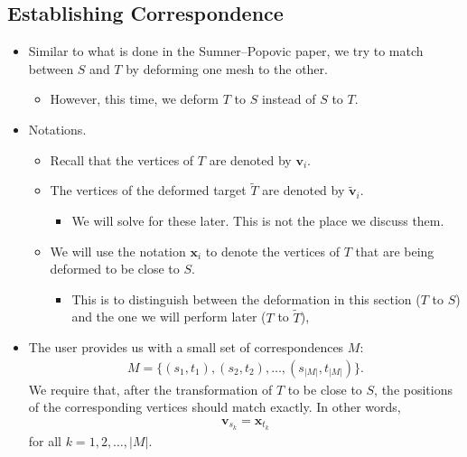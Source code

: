 \documentclass[10pt]{article}
\newcommand{\ve}[1]{\mathbf{#1}}
\begin{document}
\subsection{Establishing Correspondence}

\begin{itemize}
    \item Similar to what is done in the Sumner--Popovic paper, we try to match between $S$ and $T$ by deforming one mesh to the other.
    \begin{itemize}
        \item However, this time, we deform $T$ to $S$ instead of $S$ to $T$.
    \end{itemize}

    \item Notations.
    \begin{itemize}
        \item Recall that the vertices of $T$ are denoted by $\ve{v}_i$.
        \item The vertices of the deformed target $\widetilde{T}$ are denoted by $\widetilde{\ve{v}}_i$.
        \begin{itemize}
            \item We will solve for these later. This is not the place we discuss them.
        \end{itemize}
        \item We will use the notation $\ve{x}_i$ to denote the vertices of $T$ that are being deformed to be close to $S$.
        \begin{itemize}
            \item This is to distinguish between the deformation in this section ($T$ to $S$) and the one we will perform later ($T$ to $\widetilde{T}$), 
        \end{itemize}
    \end{itemize}

    \item The user provides us with a small set of correspondences $M$:
    \begin{align*}
        M = \{ (s_1, t_1), (s_2, t_2), \ldots, (s_{|M|}, t_{|M|}) \}.
    \end{align*}
    We require that, after the transformation of $T$ to be close to $S$, the positions of the corresponding vertices should match exactly. In other words,
    \begin{align*}
        \ve{v}_{s_k} = \ve{x}_{t_k}
    \end{align*}
    for all $k = 1, 2, \ldots, |M|$.


\end{itemize}
\end{document}
